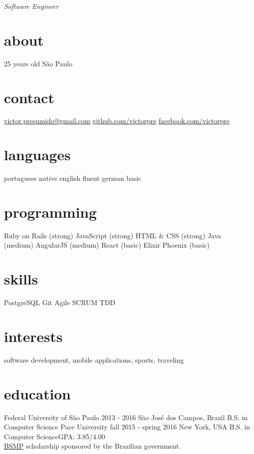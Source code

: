 \documentclass[]{friggeri-cv}
\begin{document}
       {\textit{Software Engineer}}


\begin{aside}
  \section{about}
	25 years old
	São Paulo
  \section{contact}
    {\footnotesize \href{mailto:victor.presumido@gmail.com}{victor.presumido@gmail.com}}
    \href{https://github.com/victorpre/}{github.com/victorpre}
    \href{http://facebook.com/victorpre}{facebook.com/victorpre}
  \section{languages}
    portuguese native
    english fluent
    german basic
  \section{programming}
    Ruby on Rails (strong)
    JavaScript (strong)
    HTML \& CSS (strong)
    Java (medium)
    AngularJS  (medium)
    React (basic)
    Elixir Phoenix (basic)
 \section{skills}
	PostgreSQL
	Git
	Agile SCRUM
	TDD
\end{aside}


\section{interests}

software development, mobile applications, sports, traveling

\section{education}

\begin{entrylist}
  \entry
    {Federal University of São Paulo}
    {2013 - 2016}
    {São José dos Campos, Brazil}
    {B.S. in Computer Science}
  \entry
    {Pace University}
    {fall 2015 - spring 2016}
    {New York, USA}
    {B.S. in Computer Science\hfill{\small GPA: 3.85/4.00}\\
    \href{http://www.iie.org/programs/brazil-scientific-mobility}{BSMP} scholarship sponsored by the Brazilian government.}
 \end{entrylist}
\end{document}
